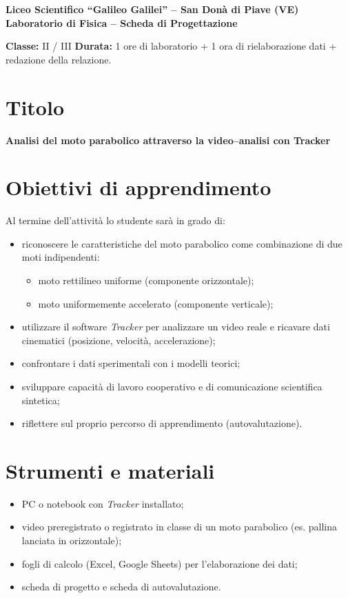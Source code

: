 \documentclass[11pt,a4paper]{article}
\begin{document}
\begin{center}
\textbf{\Large Liceo Scientifico ``Galileo Galilei'' -- San Donà di Piave (VE)}\\[0.2cm]
\textbf{\large Laboratorio di Fisica -- Scheda di Progettazione}\\[0.4cm]
\end{center}

\noindent
\textbf{Classe:} II / III \hfill
\textbf{Durata:} 1 ore di laboratorio + 1 ora di rielaborazione dati + redazione della relazione.

\vspace{0.4cm}

\section*{Titolo}
\textbf{Analisi del moto parabolico attraverso la video--analisi con Tracker}

\section*{Obiettivi di apprendimento}
Al termine dell’attività lo studente sarà in grado di:
\begin{itemize}
    \item riconoscere le caratteristiche del moto parabolico come combinazione di due moti indipendenti:
    \begin{itemize}
        \item moto rettilineo uniforme (componente orizzontale);
        \item moto uniformemente accelerato (componente verticale);
    \end{itemize}
    \item utilizzare il software \textit{Tracker} per analizzare un video reale e ricavare dati cinematici
    (posizione, velocità, accelerazione);
    \item confrontare i dati sperimentali con i modelli teorici;
    \item sviluppare capacità di lavoro cooperativo e di comunicazione scientifica sintetica;
    \item riflettere sul proprio percorso di apprendimento (autovalutazione).
\end{itemize}

\section*{Strumenti e materiali}
\begin{itemize}
    \item PC o notebook con \textit{Tracker} installato;
    \item video preregistrato o registrato in classe di un moto parabolico (es. pallina lanciata in orizzontale);
    \item fogli di calcolo (Excel, Google Sheets) per l’elaborazione dei dati;
    \item scheda di progetto e scheda di autovalutazione.
\end{itemize}
\end{document}
